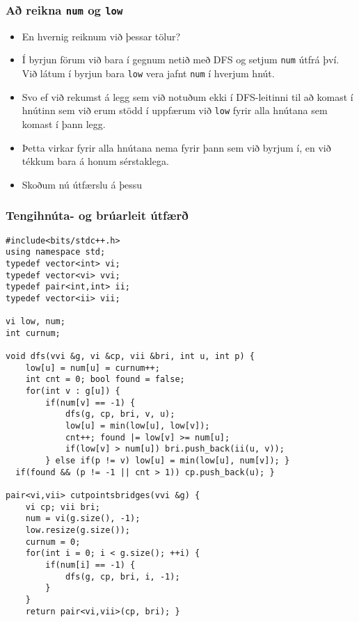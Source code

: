 \documentclass{beamer}
\begin{document}
\begin{frame}[fragile]
\frametitle{Að reikna \texttt{num} og \texttt{low}}

\begin{itemize}

\item<1-> En hvernig reiknum við þessar tölur?

\item<2-> Í byrjun förum við bara í gegnum netið með DFS og setjum \texttt{num} útfrá því. Við látum í byrjun bara \texttt{low} vera jafnt \texttt{num} í hverjum hnút.

\item<3-> Svo ef við rekumst á legg sem við notuðum ekki í DFS-leitinni til að komast í hnútinn sem við erum stödd í uppfærum við \texttt{low} fyrir alla hnútana sem komast í þann legg.

\item<4-> Þetta virkar fyrir alla hnútana nema fyrir þann sem við byrjum í, en við tékkum bara á honum sérstaklega.

\item<5-> Skoðum nú útfærslu á þessu

\end{itemize}

\end{frame}

\begin{frame}[fragile]
\frametitle{Tengihnúta- og brúarleit útfærð}

\begin{tiny}
\begin{verbatim}
#include<bits/stdc++.h>
using namespace std;
typedef vector<int> vi;
typedef vector<vi> vvi;
typedef pair<int,int> ii;
typedef vector<ii> vii;

vi low, num;
int curnum;

void dfs(vvi &g, vi &cp, vii &bri, int u, int p) {
    low[u] = num[u] = curnum++;
    int cnt = 0; bool found = false;
    for(int v : g[u]) {
        if(num[v] == -1) {
            dfs(g, cp, bri, v, u);
            low[u] = min(low[u], low[v]);
            cnt++; found |= low[v] >= num[u];
            if(low[v] > num[u]) bri.push_back(ii(u, v));
        } else if(p != v) low[u] = min(low[u], num[v]); }
  if(found && (p != -1 || cnt > 1)) cp.push_back(u); }

pair<vi,vii> cutpointsbridges(vvi &g) {
    vi cp; vii bri;
    num = vi(g.size(), -1);
    low.resize(g.size());
    curnum = 0;
    for(int i = 0; i < g.size(); ++i) {
        if(num[i] == -1) {
            dfs(g, cp, bri, i, -1);
        }
    }
    return pair<vi,vii>(cp, bri); }
\end{verbatim}
\end{tiny}

\end{frame}
\end{document}
